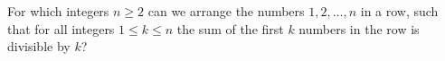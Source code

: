 For which integers $n\geq 2$ can we arrange the numbers $1,2,\dots,n$ in a row,
such that for all integers $1\leq k\leq n$ the sum of the first $k$ numbers in the row is divisible by $k$?
